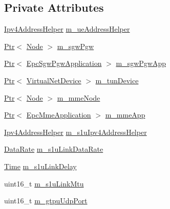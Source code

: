 \subsection*{Private Attributes}
\begin{DoxyCompactItemize}
\item 
\hyperlink{classns3_1_1Ipv4AddressHelper}{Ipv4\+Address\+Helper} \hyperlink{classns3_1_1PointToPointEpcHelper_a622990871d0bc28bceae79accc9cdf43}{m\+\_\+ue\+Address\+Helper}
\item 
\hyperlink{classns3_1_1Ptr}{Ptr}$<$ \hyperlink{classns3_1_1Node}{Node} $>$ \hyperlink{classns3_1_1PointToPointEpcHelper_a4adab05b0300264e93a3a81f249dfbd8}{m\+\_\+sgw\+Pgw}
\item 
\hyperlink{classns3_1_1Ptr}{Ptr}$<$ \hyperlink{classns3_1_1EpcSgwPgwApplication}{Epc\+Sgw\+Pgw\+Application} $>$ \hyperlink{classns3_1_1PointToPointEpcHelper_ae802bf7daf9022ab6d78333de1ac5a31}{m\+\_\+sgw\+Pgw\+App}
\item 
\hyperlink{classns3_1_1Ptr}{Ptr}$<$ \hyperlink{classns3_1_1VirtualNetDevice}{Virtual\+Net\+Device} $>$ \hyperlink{classns3_1_1PointToPointEpcHelper_a57d0bd3ff019f5bec7254f0d03414128}{m\+\_\+tun\+Device}
\item 
\hyperlink{classns3_1_1Ptr}{Ptr}$<$ \hyperlink{classns3_1_1Node}{Node} $>$ \hyperlink{classns3_1_1PointToPointEpcHelper_a426c5c35e890ce608c925348e4023b0f}{m\+\_\+mme\+Node}
\item 
\hyperlink{classns3_1_1Ptr}{Ptr}$<$ \hyperlink{classns3_1_1EpcMmeApplication}{Epc\+Mme\+Application} $>$ \hyperlink{classns3_1_1PointToPointEpcHelper_a283ac6856b092d9cfa751c04029cbdc3}{m\+\_\+mme\+App}
\item 
\hyperlink{classns3_1_1Ipv4AddressHelper}{Ipv4\+Address\+Helper} \hyperlink{classns3_1_1PointToPointEpcHelper_a0566b197857168bbad76f8c72fd849d6}{m\+\_\+s1u\+Ipv4\+Address\+Helper}
\item 
\hyperlink{classns3_1_1DataRate}{Data\+Rate} \hyperlink{classns3_1_1PointToPointEpcHelper_a0fab7f53e1e32ea56de65de870135ad1}{m\+\_\+s1u\+Link\+Data\+Rate}
\item 
\hyperlink{classns3_1_1Time}{Time} \hyperlink{classns3_1_1PointToPointEpcHelper_ab89c8a8ac200c9a7f57a86c41f8d23c2}{m\+\_\+s1u\+Link\+Delay}
\item 
uint16\+\_\+t \hyperlink{classns3_1_1PointToPointEpcHelper_a3d643e8da4aafa252b79b17246d12a7e}{m\+\_\+s1u\+Link\+Mtu}
\item 
uint16\+\_\+t \hyperlink{classns3_1_1PointToPointEpcHelper_afe0543e08ac6d9ed1861e0685ca06ab1}{m\+\_\+gtpu\+Udp\+Port}

\end{DoxyCompactItemize}
